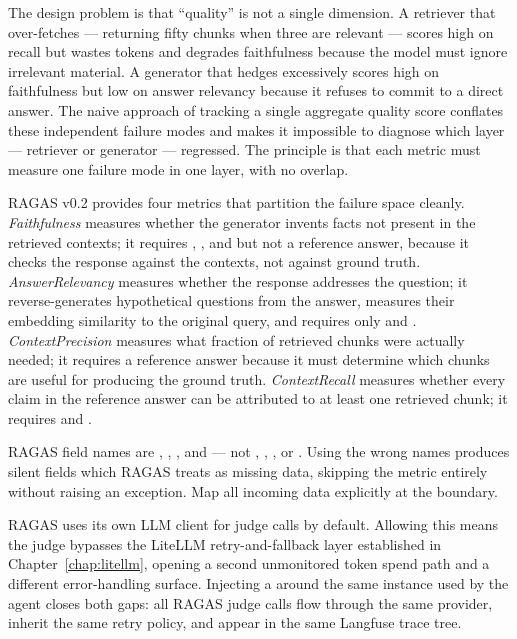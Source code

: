 The design problem is that ``quality'' is not a single dimension.  A
retriever that over-fetches --- returning fifty chunks when three are
relevant --- scores high on recall but wastes tokens and degrades
faithfulness because the model must ignore irrelevant material.  A
generator that hedges excessively scores high on faithfulness but low on
answer relevancy because it refuses to commit to a direct answer.  The
naive approach of tracking a single aggregate quality score conflates these
independent failure modes and makes it impossible to diagnose which layer
--- retriever or generator --- regressed.  The principle is that each
metric must measure one failure mode in one layer, with no overlap.

RAGAS v0.2 provides four metrics that partition the failure space cleanly.
\emph{Faithfulness} measures whether the generator invents facts not present
in the retrieved contexts; it requires , ,
and  but not a reference answer, because it checks
the response against the contexts, not against ground truth.
\emph{AnswerRelevancy} measures whether the response addresses the question;
it reverse-generates hypothetical questions from the answer, measures their
embedding similarity to the original query, and requires only
 and .  \emph{ContextPrecision} measures
what fraction of retrieved chunks were actually needed; it requires a
reference answer because it must determine which chunks are useful for
producing the ground truth.  \emph{ContextRecall} measures whether every
claim in the reference answer can be attributed to at least one retrieved
chunk; it requires  and .

\begin{notebox}
RAGAS  field names are ,
, , and  ---
not , , , or .
Using the wrong names produces silent  fields which RAGAS treats
as missing data, skipping the metric entirely without raising an exception.
Map all incoming data explicitly at the boundary.
\end{notebox}

RAGAS uses its own LLM client for judge calls by default.  Allowing this
means the judge bypasses the LiteLLM retry-and-fallback layer established
in Chapter~\ref{chap:litellm}, opening a second unmonitored token spend path
and a different error-handling surface.  Injecting a
 around the same  instance used
by the agent closes both gaps: all RAGAS judge calls flow through the same
provider, inherit the same retry policy, and appear in the same Langfuse
trace tree.

